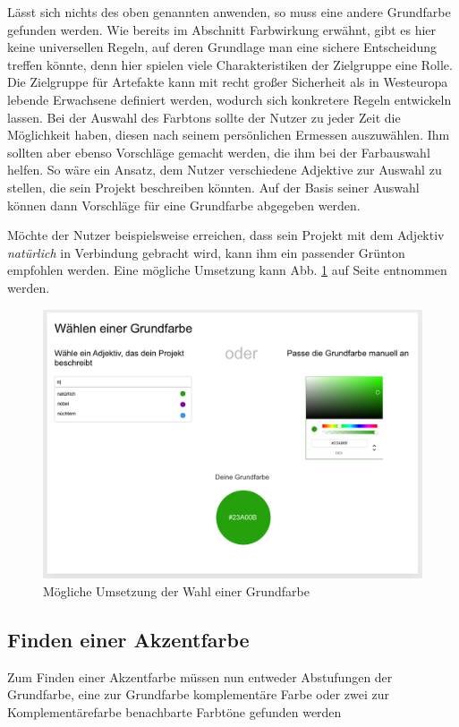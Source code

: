 Lässt sich nichts des oben genannten anwenden, so muss eine andere Grundfarbe gefunden werden. Wie bereits im Abschnitt Farbwirkung erwähnt, gibt es hier keine universellen Regeln, auf deren Grundlage man eine sichere Entscheidung treffen könnte, denn hier spielen viele Charakteristiken der Zielgruppe eine Rolle. Die Zielgruppe für Artefakte kann mit recht großer Sicherheit als in Westeuropa lebende Erwachsene definiert werden, wodurch sich konkretere Regeln entwickeln lassen.
Bei der Auswahl des Farbtons sollte der Nutzer zu jeder Zeit die Möglichkeit haben, diesen nach seinem persönlichen Ermessen auszuwählen. Ihm sollten aber ebenso Vorschläge gemacht werden, die ihm bei der Farbauswahl helfen. So wäre ein Ansatz, dem Nutzer verschiedene Adjektive zur Auswahl zu stellen, die sein Projekt beschreiben könnten. Auf der Basis seiner Auswahl können dann Vorschläge für eine Grundfarbe abgegeben werden.

Möchte der Nutzer beispielsweise erreichen, dass sein Projekt mit dem Adjektiv \textit{natürlich} in Verbindung gebracht wird, kann ihm ein passender Grünton empfohlen werden. Eine mögliche Umsetzung kann Abb. \ref{fig:wire-base-color} auf Seite \pageref{fig:wire-base-color} entnommen werden.

\begin{figure}[h]
    \centering
    \includegraphics[width=1\textwidth]{images/wireframe-base-color.png}
    \caption{Mögliche Umsetzung der Wahl einer Grundfarbe}
    \label{fig:wire-base-color}
\end{figure}

\subsection{Finden einer Akzentfarbe}
Zum Finden einer Akzentfarbe müssen nun entweder Abstufungen der Grundfarbe, eine zur Grundfarbe komplementäre Farbe oder zwei zur Komplementärefarbe benachbarte Farbtöne gefunden werden

